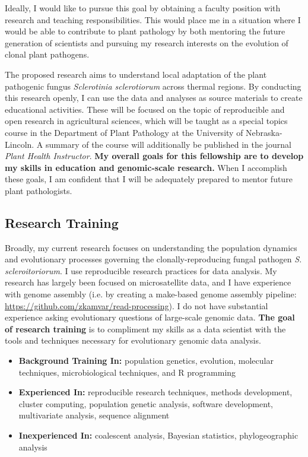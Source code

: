 \documentclass[12pt,letterpaper]{article}
\begin{document}
Ideally, I would like to pursue this goal by obtaining a faculty position with
research and teaching responsibilities. 
This would place me in a situation where I would be able to contribute to plant pathology by both mentoring the future generation of scientists and pursuing my research interests on the evolution of clonal plant pathogens.

The proposed research aims to understand local adaptation of the plant pathogenic fungus \textit{Sclerotinia sclerotiorum} across thermal regions. 
By conducting this research openly, I can use the data and analyses as source materials to create educational activities. 
These will be focused on the topic of reproducible and open research in agricultural sciences, which will be taught as a special topics course in the Department of Plant Pathology at the University of Nebraska-Lincoln. 
A summary of the course will additionally be published in the journal \textit{Plant Health Instructor}. 
\textbf{My overall goals for this fellowship are to develop my skills in education and genomic-scale research.}
When I accomplish these goals, I am confident that I will be adequately prepared to mentor future plant pathologists.

\subsection{Research Training}

Broadly, my current research focuses on understanding the population dynamics and evolutionary processes governing the clonally-reproducing fungal pathogen \textit{S. scleroitoriorum}.
I use reproducible research practices for data analysis. 
My research has largely been focused on microsatellite data, and I have experience with genome assembly (i.e. by creating a make-based genome assembly pipeline: \url{https://github.com/zkamvar/read-processing}).
I do not have substantial experience asking evolutionary questions of large-scale genomic data. 
\textbf{The goal of research training} is to compliment my skills as a data scientist with the tools and techniques necessary for evolutionary genomic data analysis. 

\begin{itemize}
  \item \textbf{Background Training In:} population genetics, evolution, molecular techniques, microbiological techniques, and R programming
  \item \textbf{Experienced In:} reproducible research techniques, methods development, cluster computing, population genetic analysis, software development, multivariate analysis, sequence alignment
  \item \textbf{Inexperienced In:} coalescent analysis, Bayesian statistics, phylogeographic analysis
\end{itemize}
\end{document}
